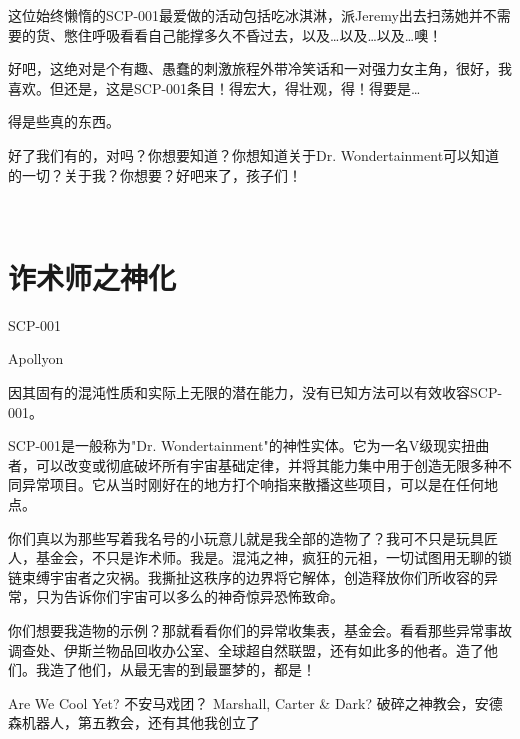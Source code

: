 这位始终懒惰的SCP-001最爱做的活动包括吃冰淇淋，派Jeremy出去扫荡她并不需要的货、憋住呼吸看看自己能撑多久不昏过去，以及…以及…以及…噢！

好吧，这绝对是个有趣、愚蠢的刺激旅程外带冷笑话和一对强力女主角，很好，我喜欢。但还是，这是SCP-001条目！得宏大，得壮观，得！得要是…

得是些真的东西。

好了我们有的，对吗？你想要知道？你想知道关于Dr. Wondertainment可以知道的一切？关于我？你想要？好吧来了，孩子们！

\\

\hr

\newpage

\section{诈术师之神化}

\label{sec:SCP-001.a.simple.toymaker.offset.4}

SCP-001

Apollyon

因其固有的混沌性质和实际上无限的潜在能力，没有已知方法可以有效收容SCP-001。

SCP-001是一般称为"Dr. Wondertainment"的神性实体。它为一名V级现实扭曲者，可以改变或彻底破坏所有宇宙基础定律，并将其能力集中用于创造无限多种不同异常项目。它从当时刚好在的地方打个响指来散播这些项目，可以是在任何地点。

你们真以为那些写着我名号的小玩意儿就是我全部的造物了？我可不只是玩具匠人，基金会，不只是诈术师。我是。混沌之神，疯狂的元祖，一切试图用无聊的锁链束缚宇宙者之灾祸。我撕扯这秩序的边界将它解体，创造释放你们所收容的异常，只为告诉你们宇宙可以多么的神奇惊异恐怖致命。

你们想要我造物的示例？那就看看你们的异常收集表，基金会。看看那些异常事故调查处、伊斯兰物品回收办公室、全球超自然联盟，还有如此多的他者。造了他们。我造了他们，从最无害的到最噩梦的，都是！

Are We Cool Yet? 不安马戏团？ Marshall, Carter \& Dark? 破碎之神教会，安德森机器人，第五教会，还有其他我创立了

